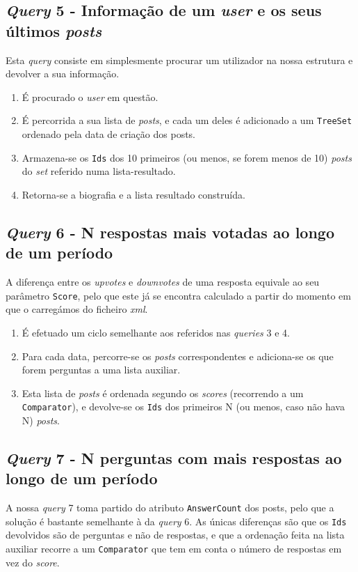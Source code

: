 \documentclass[10pt]{article}
\begin{document}
	\subsection*{\textit{Query} 5 - Informação de um \textit{user} e os seus últimos \textit{posts}}
			Esta \textit{query} consiste em simplesmente procurar um utilizador na nossa estrutura
		e devolver a sua informação.			
		\begin{enumerate}
			\item É procurado o \textit{user} em questão.
			\item É percorrida a sua lista de \textit{posts}, e cada 
		um deles é adicionado a um \texttt{TreeSet} ordenado pela
		data de criação dos posts.
			\item Armazena-se os \texttt{Ids} dos 10 primeiros (ou 
		menos, se forem menos de 10) \textit{posts} do \textit{set} 
		referido numa lista-resultado.
			\item Retorna-se a biografia e a lista resultado 
			construída.
		\end{enumerate}
	\subsection*{\textit{Query} 6 - N respostas mais votadas ao longo de um período}
			A diferença entre os \textit{upvotes} e \textit{downvotes} de uma resposta
		equivale ao seu parâmetro \texttt{Score}, pelo que este já se encontra calculado
		a partir do momento em que o carregámos do ficheiro \textit{xml}.
			\begin{enumerate}
				\item É efetuado um ciclo semelhante aos referidos 
			nas \textit{queries} 3 e 4.
				\item Para cada data, percorre-se os \textit{posts} 
			correspondentes e adiciona-se os que forem perguntas 
			a uma lista auxiliar.
				\item Esta lista de \textit{posts} é ordenada 
			segundo os \textit{scores} (recorrendo a um 
			\texttt{Comparator}), e devolve-se os \texttt{Ids} dos 
			primeiros N (ou menos, caso não hava N) \textit{posts}.
			\end{enumerate}
	\subsection*{\textit{Query} 7 - N perguntas com mais respostas ao longo de um período}
			A nossa \textit{query} 7 toma partido do atributo
		\texttt{AnswerCount} dos posts, pelo que a solução é bastante 
		semelhante à da \textit{query} 6. As únicas diferenças são 
		que os \texttt{Ids} devolvidos são de perguntas e não de 
		respostas, e que a ordenação feita na lista auxiliar 
		recorre a um \texttt{Comparator} que tem em conta o número
		de respostas em vez do \textit{score}.
\end{document}
